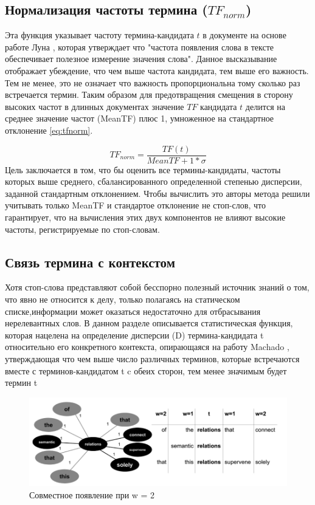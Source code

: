 \subsection{Нормализация частоты термина ($TF_{norm}$)}
Эта функция указывает частоту  термина-кандидата $t$ в документе на основе работе Луна \cite{18}, которая утверждает что "частота появления слова в тексте обеспечивает полезное измерение значения слова".
Данное высказывание отображает убеждение, что чем выше частота кандидата, тем выше его важность.
Тем не менее, это не означает что важность пропорциональна тому сколько раз встречается термин.
Таким образом для предотвращения смещения в сторону высоких частот в длинных документах значение $TF$ кандидата $t$ делится на среднее значение частот (MeanTF) плюс 1, умноженное на стандартное отклонение \eqref{eq:tfnorm}.

\begin{equation}
	\label{eq:tfnorm}
	TF_{norm} = \frac{TF(t)}{MeanTF + 1 * \sigma}
\end{equation} 
Цель заключается в том, что бы оценить все термины-кандидаты, частоты которых выше среднего, сбалансированного определенной степенью дисперсии, заданной стандартным отклонением.
Чтобы вычислить это авторы метода решили учитывать только MeanTF и стандартое отклонение не стоп-слов, что гарантирует, что на вычисления этих двух компонентов не влияют высокие частоты, регистрируемые по стоп-словам.

\subsection{Связь термина с контекстом}
Хотя стоп-слова представляют собой бесспорно полезный источник знаний о том, что явно не относится к делу, только полагаясь на статическом списке,информации может оказаться недостаточно для отбрасывания нерелевантных слов.
В данном разделе описывается статистическая функция, которая нацелена на определение дисперсии (D) термина-кандидата t относительно его конкретного контекста, опирающаяся на работу Machado \cite{19}, утверждающая что чем выше число различных терминов, которые встречаются вместе с терминов-кандидатом t c обеих сторон, тем менее значимым будет термин t

\begin{figure}[!h]
	\centering
	\includegraphics[width=1\linewidth]{src/img/coocurrences_example}
	\caption{Совместное появление при w = 2}
	\label{fig:coocurrencesexample}
\end{figure}

